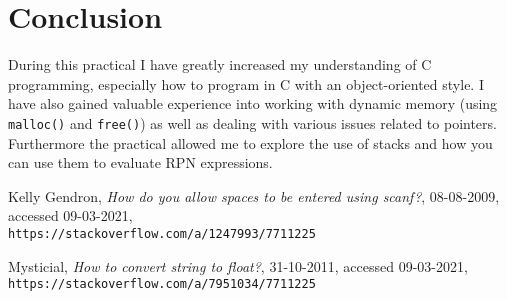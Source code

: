 \documentclass{article}
\begin{document}
\section{Conclusion}
During this practical I have greatly increased my understanding of C programming, especially how to program in C with an object-oriented style. I have also gained valuable experience into working with dynamic memory (using \verb+malloc()+ and \verb+free()+) as well as dealing with various issues related to pointers. Furthermore the practical allowed me to explore the use of stacks and how you can use them to evaluate RPN expressions.

\begin{thebibliography}{10}
Kelly Gendron, \textit{How do you allow spaces to be entered using scanf?}, 08-08-2009, accessed 09-03-2021, \\\texttt{https://stackoverflow.com/a/1247993/7711225}

Mysticial, \textit{How to convert string to float?}, 31-10-2011, accessed 09-03-2021, \\\texttt{https://stackoverflow.com/a/7951034/7711225}

\end{thebibliography}
\end{document}
